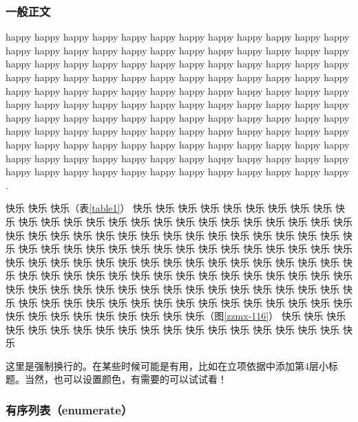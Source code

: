 
\subsubsection{一般正文}

\justifying

\indent\setlength{\parindent}{2em}%

happy happy happy happy happy happy happy happy happy happy happy happy happy happy happy happy happy happy happy happy happy happy happy happy happy happy happy happy happy happy happy happy happy happy happy happy happy happy happy happy happy happy happy happy happy happy happy happy happy happy happy happy happy happy happy happy happy happy happy happy happy happy happy happy happy happy happy happy happy happy happy happy happy happy happy happy happy happy happy happy happy\cite{Smith1900} happy happy happy happy happy happy happy happy happy happy happy happy happy happy happy happy happy happy happy happy happy happy happy happy happy happy happy happy happy happy happy happy happy happy happy happy happy happy happy happy happy happy happy happy happy happy happy happy happy happy happy \cite{John1997}.

快乐 快乐 快乐（表\ref{table1}） 快乐 快乐 快乐 快乐 快乐 快乐 快乐 快乐 快乐 快乐 快乐 快乐 快乐 快乐 快乐 快乐 快乐 快乐 快乐 快乐 快乐 快乐 快乐 快乐 快乐 快乐 快乐 快乐 快乐 快乐 快乐 快乐 快乐 快乐 快乐 快乐 快乐 快乐 快乐 快乐 快乐 快乐 快乐 快乐 快乐 快乐 快乐 快乐 快乐 快乐 快乐 快乐 快乐 快乐 快乐 快乐 快乐 快乐 快乐 快乐 快乐 快乐 快乐 快乐 快乐 快乐 快乐 快乐 快乐 快乐 快乐 快乐 快乐 快乐 快乐 快乐 快乐 快乐 快乐 快乐 快乐 快乐 快乐 快乐 快乐 快乐 快乐 快乐 快乐 快乐 快乐 快乐 快乐 快乐 快乐 快乐 快乐 快乐 快乐 快乐 快乐 快乐 快乐 快乐 快乐 快乐 快乐 快乐 快乐 快乐 快乐 快乐 快乐 快乐 快乐 快乐 快乐 快乐 快乐 快乐 快乐 快乐 快乐 快乐 快乐 快乐 快乐（图\ref{zzmx-116}） 快乐 快乐 快乐 快乐 快乐 快乐 快乐 快乐 快乐 快乐 快乐 快乐 快乐 快乐 快乐 快乐 快乐 快乐 快乐 

\indent\setlength{\parindent}{2em}

这里是强制换行的。在某些时候可能是有用，比如在立项依据中添加第4层小标题。当然，也可以设置颜色，有需要的可以试试看！

\subsubsection{有序列表（enumerate）}
\indent\setlength{\parindent}{2em}

